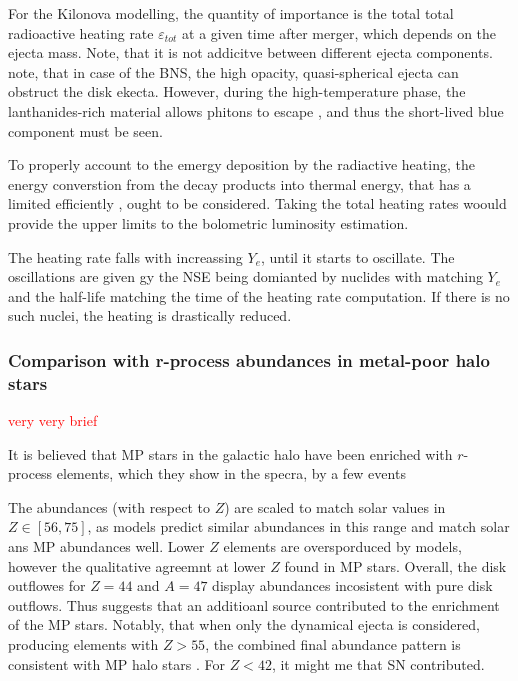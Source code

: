 \documentclass[11pt,a4paper,headinclude=true,DIV=14,BCOR=8mm,chapterprefix,listof=totoc,twoside,openright,abstracton]{scrbook}
\newcommand{\red}[1]{\textcolor{red}{#1}}
\begin{document}
For the Kilonova modelling, the quantity of importance is the total total radioactive heating rate $\varepsilon_{tot}$ at a given time after merger, which depends on the ejecta mass. Note, that it is not addicitve between different ejecta components. note, that in case of the BNS, the high opacity, quasi-spherical ejecta \cite{(e.g., Hotokezaka et al.,2013b)} can obstruct the disk ekecta. However, during the high-temperature phase, the lanthanides-rich material allows phitons to escape \cite{(Barnes and Kasen, 2013; Fernandez et al., 2017)}, and thus the short-lived blue component must be seen.

To properly account to the emergy deposition by the radiactive heating, the energy converstion from the decay products into thermal energy, that has a limited efficiently \cite{(e.g., Metzger et al., 2010; Hotokezaka et al., 2016; Barnes et al., 2016)}, ought to be considered. Taking the total heating rates woould provide the upper limits to the bolometric luminosity estimation. 

The heating rate falls with increassing $Y_e$, until it starts to oscillate. The oscillations are given gy the NSE being domianted by nuclides with matching $Y_e$ and the half-life matching the time of the heating rate computation. If there is no such nuclei, the heating is drastically reduced. 


\subsubsection{Comparison with r-process abundances in metal-poor halo stars}
\red{very very brief}

It is believed that MP stars in the galactic halo have been enriched with $r$-process elements, which they show in the specra, by a few events \cite{(Cowan et al., 1999)}

The abundances (with respect to $Z$) are scaled to match solar values in $Z\in[56,75]$, as models predict similar abundances in this range and match solar ans MP abundances well. 
Lower $Z$ elements are oversporduced by models, however the qualitative agreemnt at lower $Z$ found in MP stars.
Overall, the disk outflowes for $Z=44$ and $A=47$ display abundances incosistent with pure disk outflows. Thus suggests that an additioanl source contributed to the enrichment of the MP stars.
Notably, that when only the dynamical ejecta is considered, producing elements with $Z>55$, the combined final abundance pattern is consistent with MP halo stars \cite{(cf. Just et al., 2015).}. For $Z<42$, it might me that SN contributed. 
\end{document}
